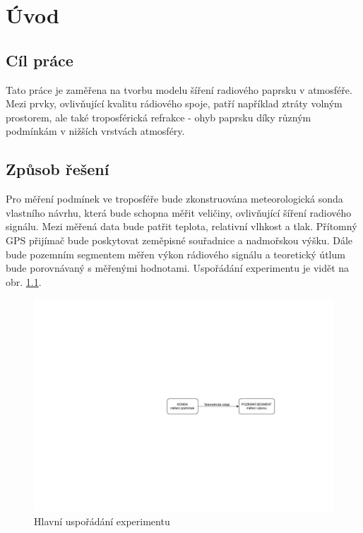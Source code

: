 \documentclass[twoside]{ctuthesis}
\theoremstyle{plain}
\theoremstyle{definition}
\theoremstyle{note}
\begin{document}
\maketitle

\chapter{Úvod}
	\section{Cíl práce}
	Tato práce je zaměřena na tvorbu modelu šíření radiového paprsku v atmosféře. Mezi prvky, ovlivňující kvalitu rádiového spoje, patří například ztráty volným prostorem, ale také troposférická refrakce - ohyb paprsku díky různým podmínkám v nižších vrstvách atmosféry.
	

	\section{Způsob řešení}
	Pro měření podmínek ve troposféře bude zkonstruována meteorologická sonda vlastního návrhu, která bude schopna měřit veličiny, ovlivňující šíření radiového signálu. Mezi měřená data bude patřit teplota, relativní vlhkost a tlak. Přítomný GPS přijímač bude poskytovat zeměpisné souřadnice a nadmořskou výšku. Dále bude pozemním segmentem měřen výkon rádiového signálu a teoretický útlum bude porovnávaný s měřenými hodnotami. Uspořádání experimentu je vidět na obr. \ref{diagram:main}.

	\begin{figure}[hbtp]
		\centering
		\includegraphics[width=.6\textwidth]{Figures/main_diagram.pdf}
		\caption{Hlavní uspořádání experimentu}
		\label{diagram:main}
	\end{figure}
\end{document}
